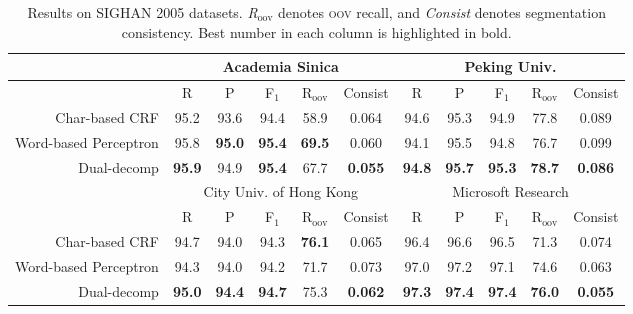 \begin{table*}
\centering
\begin{small}
\begin{tabular}{ r | c | c | c | c | c | c | c | c | c | c  }
\multicolumn{1}{c|}{} & \multicolumn{5}{c|}{Academia Sinica} &  \multicolumn{5}{c}{Peking Univ.} \\
\hline
\multicolumn{1}{c}{}   & \multicolumn{1}{|c}{R} &  \multicolumn{1}{c}{P}     &  \multicolumn{1}{c}{F$_1$}   &    \multicolumn{1}{c}{R$_{\mathrm{oov}}$}   &   \multicolumn{1}{c}{Consist}  & \multicolumn{1}{|c}{R}  &  \multicolumn{1}{c}{P}   &  \multicolumn{1}{c}{F$_1$}   &   \multicolumn{1}{c}{R$_{\mathrm{oov}}$}  &   \multicolumn{1}{c}{Consist} \\ 
Char-based CRF    &  95.2 &   93.6  & 94.4  &  58.9 & 0.064                                               &  94.6             &    95.3 & 94.9  &   77.8   & 0.089    \\
Word-based Perceptron &  95.8 & \textbf{95.0} & \textbf{95.4}  & \textbf{69.5} & 0.060  &  94.1             & 95.5  & 94.8  &  76.7 & 0.099     \\ 
Dual-decomp      & \textbf{95.9} & 94.9   & \textbf{95.4}  & {67.7} & \textbf{0.055}            & \textbf{94.8} & \textbf{95.7} & \textbf{95.3}  &  \textbf{78.7} & \textbf{0.086}   \\
\multicolumn{1}{c|}{} &  \multicolumn{5}{c|}{City Univ. of Hong Kong} &  \multicolumn{5}{c}{Microsoft Research}  \\
\hline
\multicolumn{1}{c}{}   & \multicolumn{1}{|c}{R} &  \multicolumn{1}{c}{P}     &  \multicolumn{1}{c}{F$_1$}   &    \multicolumn{1}{c}{R$_{\mathrm{oov}}$}   &   \multicolumn{1}{c}{Consist}  & \multicolumn{1}{|c}{R}  &  \multicolumn{1}{c}{P}   &  \multicolumn{1}{c}{F$_1$}   &   \multicolumn{1}{c}{R$_{\mathrm{oov}}$}  &   \multicolumn{1}{c}{Consist} \\ 
Char-based CRF                 & 94.7 & 94.0 & 94.3  & \textbf{76.1}                            & 0.065             & 96.4 &              96.6 &             96.5  & 71.3 & 0.074 \\
Word-based Perceptron    & 94.3 & 94.0 & 94.2  & 71.7                                         & 0.073              &  97.0 &              97.2                & 97.1  & 74.6 & 0.063  \\
Dual-decomp                   & \textbf{95.0} & \textbf{94.4}  & \textbf{94.7}  & {75.3} & \textbf{0.062} & \textbf{97.3} &  \textbf{97.4} &  \textbf{97.4}  & \textbf{76.0} & \textbf{0.055}  \\
\end{tabular} 
\caption{Results on SIGHAN 2005 datasets. \textit{R$_{\mathrm{oov}}$}  denotes \textsc{oov} recall, and \textit{Consist} denotes segmentation consistency. Best number in each column is highlighted in bold.
}\label{tbl:results}
\end{small}
\end{table*}

